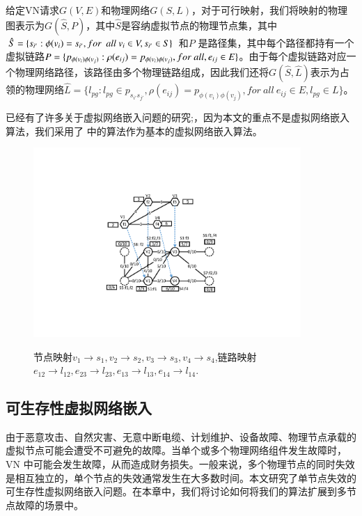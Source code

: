 给定VN请求$G(V,E)$和物理网络$G(S,L)$，对于可行映射，我们将映射的物理图表示为$G\left( {\hat S,P} \right)$，其中$\hat S$是容纳虚拟节点的物理节点集，其中$\hat S = \{ {s_{i'}}:\phi({v_i}) = {s_{i'}},for\ \ {\rm{ }}all\ {v_i} \in V,{s_{i'}} \in S\}$ 和$P$ 是路径集，其中每个路径都持有一个虚拟链路$P = \{ p_{\phi({v_i}) \phi({v_j})}:\rho(e_{ij}) = p_{\phi({v_i}) \phi({v_j})}{\rm{ }}, for\ all,{e_{ij}} \in E\}$。由于每个虚拟链路对应一个物理网络路径，该路径由多个物理链路组成，因此我们还将$G\left( {\hat S,\hat L} \right)$表示为占领的物理网络$\hat L = \{ {l_{pg}}:{l_{pg}} \in {p_{s_{i'}s_{j'}}}, \rho(e_{ij}) = p_{\phi({v_i}) \phi({v_j})},for\ all\ {e_{ij}} \in E,{l_{pg}} \in L\}$。

已经有了许多关于虚拟网络嵌入问题\cite{fischer2013virtual}的研究;，因为本文的重点不是虚拟网络嵌入算法，我们采用了\cite{lischka2009virtual} 中的算法作为基本的虚拟网络嵌入算法。


\begin{figure}[htb]
\centering
\includegraphics[width=4in]{figures/VirtualNetworkEmbedding}\\
\caption{节点映射$v_1\rightarrow s_1, v_2\rightarrow s_2, v_3\rightarrow s_3, v_4\rightarrow s_4$,链路映射$e_{12}\rightarrow l_{12},e_{23}\rightarrow l_{23},e_{13}\rightarrow l_{13},e_{14}\rightarrow l_{14}$.}\label{fig:VirtualNetworkEmbedding}
\end{figure}
\subsection{可生存性虚拟网络嵌入}
由于恶意攻击、自然灾害、无意中断电缆、计划维护、设备故障、物理节点承载的虚拟节点可能会遭受不可避免的故障。当单个或多个物理网络组件发生故障时，VN 中可能会发生故障，从而造成财务损失。一般来说，多个物理节点的同时失效是相互独立的，单个节点的失效通常发生在大多数时间\cite{yeow2010designing}。本文研究了单节点失效的可生存性虚拟网络嵌入问题。在本章中，我们将讨论如何将我们的算法扩展到多节点故障的场景中。

